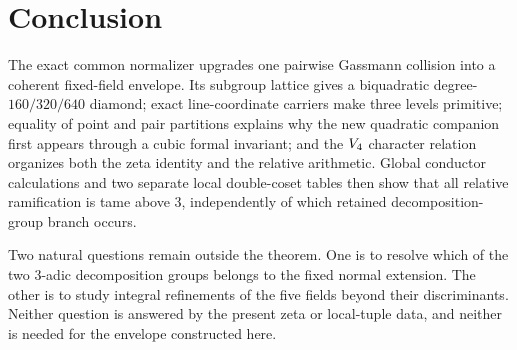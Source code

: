 \section{Conclusion}
\label{sec:conclusion}

The exact common normalizer upgrades one pairwise Gassmann collision into a
coherent fixed-field envelope.  Its subgroup lattice gives a biquadratic
degree-$160/320/640$ diamond; exact line-coordinate carriers make three
levels primitive; equality of point and pair partitions explains why the new
quadratic companion first appears through a cubic formal invariant; and the
$V_4$ character relation organizes both the zeta identity and the
relative arithmetic.  Global conductor calculations and two separate local
double-coset tables then show that all relative ramification is tame above
$3$, independently of which retained decomposition-group branch occurs.

Two natural questions remain outside the theorem.  One is to resolve which
of the two $3$-adic decomposition groups belongs to the fixed normal
extension.  The other is to study integral refinements of the five fields
beyond their discriminants.  Neither question is answered by the present
zeta or local-tuple data, and neither is needed for the envelope constructed
here.
